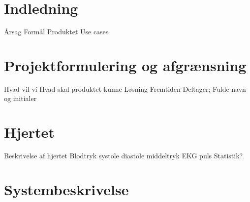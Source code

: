 \chapter{Indledning}
Årsag
Formål
Produktet
Use cases



\chapter{Projektformulering og afgrænsning}
Hvad vil vi
Hvad skal produktet kunne
Løsning
Fremtiden
Deltager; Fulde navn og initialer


\chapter{Hjertet}
Beskrivelse af hjertet
Blodtryk
systole 
diastole 
middeltryk
EKG
puls
Statistik?



\chapter{Systembeskrivelse}



